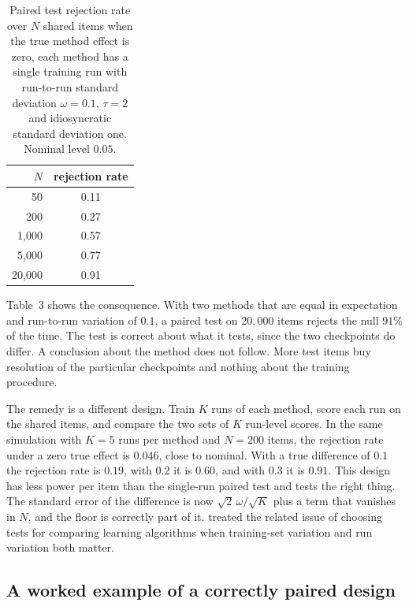 \documentclass[11pt]{article}
\theoremstyle{definition}
\begin{document}
\begin{table}[t]
\centering
\caption{Paired test rejection rate over $N$ shared items when the true method effect is zero, each method has a single training run with run-to-run standard deviation $\omega=0.1$, $\tau=2$ and idiosyncratic standard deviation one. Nominal level $0.05$.}
\begin{tabular}{rc}
\toprule
$N$ & rejection rate \\
\midrule
50     & 0.11 \\
200    & 0.27 \\
1{,}000  & 0.57 \\
5{,}000  & 0.77 \\
20{,}000 & 0.91 \\
\bottomrule
\end{tabular}
\end{table}

Table~3 shows the consequence. With two methods that are equal in expectation and run-to-run variation of $0.1$, a paired test on $20{,}000$ items rejects the null $91\%$ of the time. The test is correct about what it tests, since the two checkpoints do differ. A conclusion about the method does not follow. More test items buy resolution of the particular checkpoints and nothing about the training procedure.

The remedy is a different design. Train $K$ runs of each method, score each run on the shared items, and compare the two sets of $K$ run-level scores. In the same simulation with $K=5$ runs per method and $N=200$ items, the rejection rate under a zero true effect is $0.046$, close to nominal. With a true difference of $0.1$ the rejection rate is $0.19$, with $0.2$ it is $0.60$, and with $0.3$ it is $0.91$. This design has less power per item than the single-run paired test and tests the right thing. The standard error of the difference is now $\sqrt2\,\omega/\sqrt K$ plus a term that vanishes in $N$, and the floor is correctly part of it. \citet{dietterich1998} treated the related issue of choosing tests for comparing learning algorithms when training-set variation and run variation both matter.

\subsection{A worked example of a correctly paired design}
\end{document}
